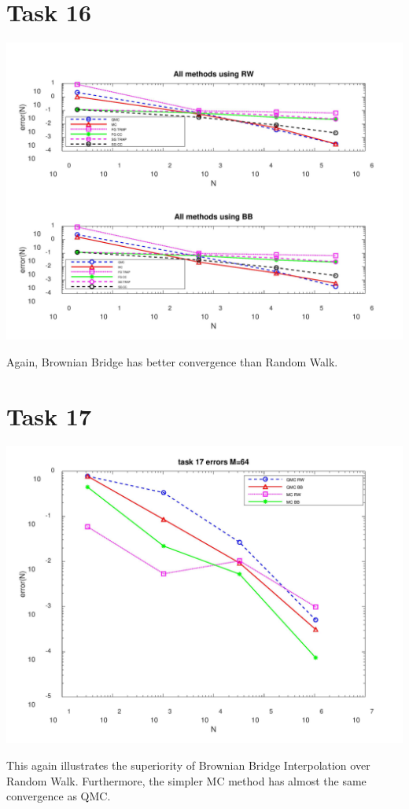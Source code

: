 \documentclass[10pt,a4paper]{article}
\begin{document}
\section*{Task 16}
\begin{center}
\includegraphics[scale=0.3]{task16.png}
\end{center}
Again, Brownian Bridge has better convergence than Random Walk. 
\section*{Task 17}
\begin{center}
\includegraphics[scale=0.28]{task17.png}
\end{center}
This again illustrates the superiority of Brownian Bridge Interpolation over
Random Walk. Furthermore, the simpler MC method has almost the same
convergence as QMC.
\end{document}
